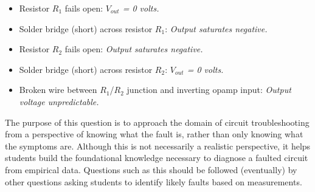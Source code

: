 





\begin{itemize}
\item{} Resistor $R_1$ fails open: {\it $V_{out}$ = 0 volts.}
\vskip 5pt
\item{} Solder bridge (short) across resistor $R_1$: {\it Output saturates negative.}
\vskip 5pt
\item{} Resistor $R_2$ fails open: {\it Output saturates negative.}
\vskip 5pt
\item{} Solder bridge (short) across resistor $R_2$: {\it $V_{out}$ = 0 volts.}
\vskip 5pt
\item{} Broken wire between $R_1$/$R_2$ junction and inverting opamp input: {\it Output voltage unpredictable.}
\end{itemize}

The purpose of this question is to approach the domain of circuit troubleshooting from a perspective of knowing what the fault is, rather than only knowing what the symptoms are.  Although this is not necessarily a realistic perspective, it helps students build the foundational knowledge necessary to diagnose a faulted circuit from empirical data.  Questions such as this should be followed (eventually) by other questions asking students to identify likely faults based on measurements.




